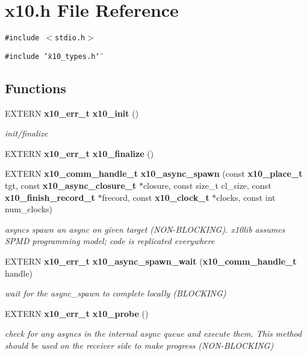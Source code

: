 \section{x10.h File Reference}
\label{x10_8h}
{\tt \#include $<$stdio.h$>$}\par
{\tt \#include \char`\"{}x10\_\-types.h\char`\"{}}\par
\subsection*{Functions}
\begin{CompactItemize}
\item 
EXTERN {\bf x10\_\-err\_\-t} {\bf x10\_\-init} ()
\begin{CompactList}\small\item\em init/finalize \item\end{CompactList}\item 
EXTERN {\bf x10\_\-err\_\-t} {\bf x10\_\-finalize} ()
\item 
EXTERN {\bf x10\_\-comm\_\-handle\_\-t} {\bf x10\_\-async\_\-spawn} (const {\bf x10\_\-place\_\-t} tgt, const {\bf x10\_\-async\_\-closure\_\-t} $\ast$closure, const size\_\-t cl\_\-size, const {\bf x10\_\-finish\_\-record\_\-t} $\ast$frecord, const {\bf x10\_\-clock\_\-t} $\ast$clocks, const int num\_\-clocks)
\begin{CompactList}\small\item\em asyncs spawn an async on given target (NON-BLOCKING). x10lib assumes SPMD programming model; code is replicated everywhere \item\end{CompactList}\item 
EXTERN {\bf x10\_\-err\_\-t} {\bf x10\_\-async\_\-spawn\_\-wait} ({\bf x10\_\-comm\_\-handle\_\-t} handle)
\begin{CompactList}\small\item\em wait for the async\_\-spawn to complete locally (BLOCKING) \item\end{CompactList}\item 
EXTERN {\bf x10\_\-err\_\-t} {\bf x10\_\-probe} ()
\begin{CompactList}\small\item\em check for any asyncs in the internal async queue and execute them. This method should be used on the receiver side to make progress (NON-BLOCKING) \item\end{CompactList}\item 

\end{CompactItemize}
